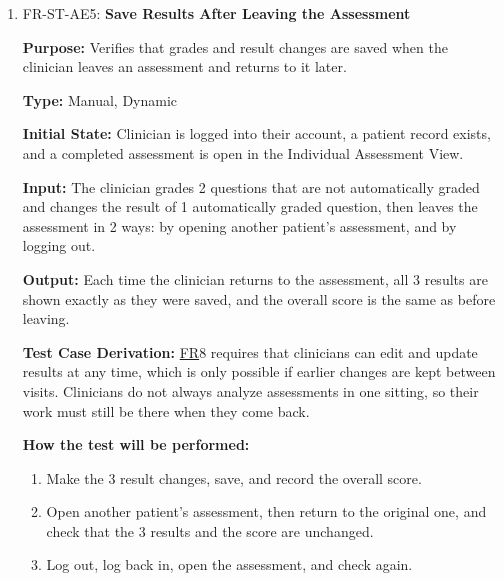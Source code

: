 \documentclass[12pt, titlepage]{article}
\newcommand{\srsfr}[1]{\href{https://github.com/Nour-Fawaz/MacaBoca/blob/main/pdfs/SRS/SRS.pdf}{FR}}
\renewcommand{\_}{\oldunderscore\allowbreak}
\begin{document}
\begin{enumerate}
  \item FR-ST-AE5: \textbf{Save Results After Leaving the Assessment\\}
  \begin{mdframed}[linewidth=0.5mm]
      \textbf{Purpose:} Verifies that grades and result changes are saved when the clinician leaves an assessment and returns to it later. \par
      \textbf{Type:} Manual, Dynamic \par
      \textbf{Initial State:} Clinician is logged into their account, a patient record exists, and a completed assessment is open in the Individual Assessment View. \par
      \textbf{Input:} The clinician grades 2 questions that are not automatically graded and changes the result of 1 automatically graded question, then leaves the assessment in 2 ways: by opening another patient's assessment, and by logging out. \par
      \textbf{Output:} Each time the clinician returns to the assessment, all 3 results are shown exactly as they were saved, and the overall score is the same as before leaving. \par
      \textbf{Test Case Derivation:} \srsfr*{8} requires that clinicians can edit and update results at any time, which is only possible if earlier changes are kept between visits. Clinicians do not always analyze assessments in one sitting, so their work must still be there when they come back. \par
      \textbf{How the test will be performed:}
      \begin{enumerate}
        \item[1.] Make the 3 result changes, save, and record the overall score.
        \item[2.] Open another patient's assessment, then return to the original one, and check that the 3 results and the score are unchanged.
        \item[3.] Log out, log back in, open the assessment, and check again.
      \end{enumerate}
  \end{mdframed}
\end{enumerate}
\end{document}

